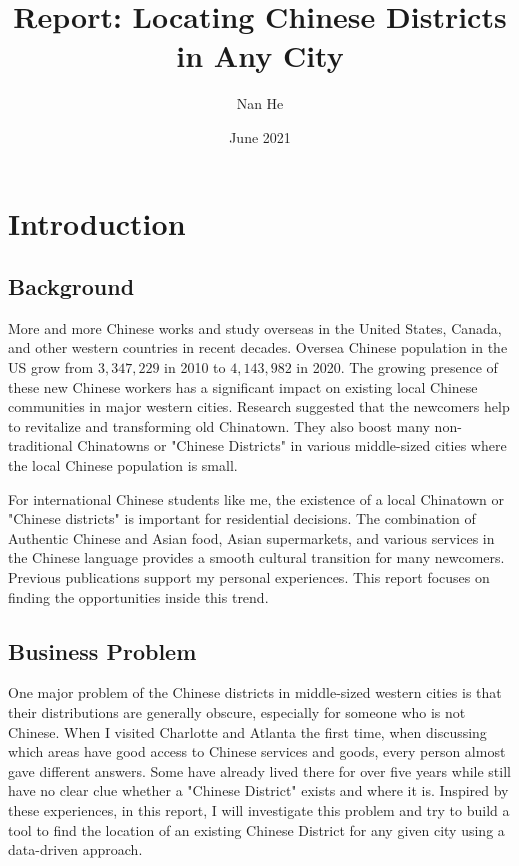 \documentclass{article}
\title{Report: Locating Chinese Districts in Any City}
\author{Nan He}
\date{June 2021}
\begin{document}
\maketitle

\section{Introduction}
\subsection{Background}
More and more Chinese works and study overseas in the United States, Canada, and other western countries in recent decades.
Oversea Chinese population in the US grow from $3,347,229$ in 2010 to $4,143,982$ in 2020.\cite{census2010chi, census2020chi}
The growing presence of these new Chinese workers has a significant impact on existing local Chinese communities in major western cities.
Research suggested that the newcomers help to revitalize and transforming old Chinatown. \cite{jia2010chinatown}
They also boost many non-traditional Chinatowns or "Chinese Districts" in various middle-sized cities where the local Chinese population is small.

For international Chinese students like me, the existence of a local Chinatown or "Chinese districts" is important for residential decisions.
The combination of Authentic Chinese and Asian food, Asian supermarkets, and various services in the Chinese language provides a smooth cultural transition for many newcomers. Previous publications support my personal experiences.\cite{zhou2010chinatown} This report focuses on finding the opportunities inside this trend.

\subsection{Business Problem}
One major problem of the Chinese districts in middle-sized western cities is that their distributions are generally obscure, especially for someone who is not Chinese.
When I visited Charlotte and Atlanta the first time, when discussing which areas have good access to Chinese services and goods, every person almost gave different answers.
Some have already lived there for over five years while still have no clear clue whether a "Chinese District" exists and where it is.
Inspired by these experiences, in this report, I will investigate this problem and try to build a tool to find the location of an existing Chinese District for any given city using a data-driven approach.
\end{document}
